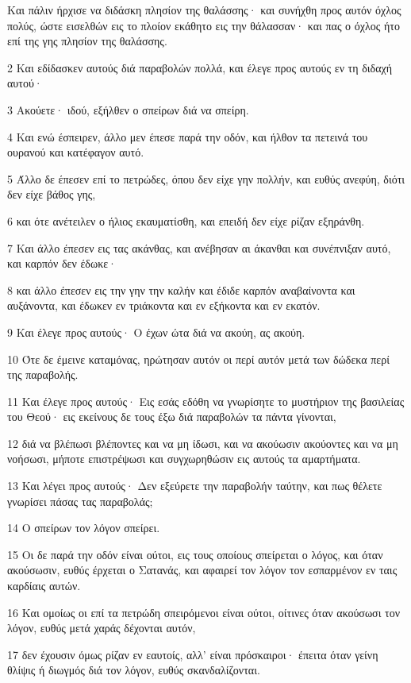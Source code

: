 \par Και πάλιν ήρχισε να διδάσκη πλησίον της θαλάσσης· και συνήχθη προς αυτόν όχλος πολύς, ώστε εισελθών εις το πλοίον εκάθητο εις την θάλασσαν· και πας ο όχλος ήτο επί της γης πλησίον της θαλάσσης.
\par 2 Και εδίδασκεν αυτούς διά παραβολών πολλά, και έλεγε προς αυτούς εν τη διδαχή αυτού·
\par 3 Ακούετε· ιδού, εξήλθεν ο σπείρων διά να σπείρη.
\par 4 Και ενώ έσπειρεν, άλλο μεν έπεσε παρά την οδόν, και ήλθον τα πετεινά του ουρανού και κατέφαγον αυτό.
\par 5 Άλλο δε έπεσεν επί το πετρώδες, όπου δεν είχε γην πολλήν, και ευθύς ανεφύη, διότι δεν είχε βάθος γης,
\par 6 και ότε ανέτειλεν ο ήλιος εκαυματίσθη, και επειδή δεν είχε ρίζαν εξηράνθη.
\par 7 Και άλλο έπεσεν εις τας ακάνθας, και ανέβησαν αι άκανθαι και συνέπνιξαν αυτό, και καρπόν δεν έδωκε·
\par 8 και άλλο έπεσεν εις την γην την καλήν και έδιδε καρπόν αναβαίνοντα και αυξάνοντα, και έδωκεν εν τριάκοντα και εν εξήκοντα και εν εκατόν.
\par 9 Και έλεγε προς αυτούς· Ο έχων ώτα διά να ακούη, ας ακούη.
\par 10 Ότε δε έμεινε καταμόνας, ηρώτησαν αυτόν οι περί αυτόν μετά των δώδεκα περί της παραβολής.
\par 11 Και έλεγε προς αυτούς· Εις εσάς εδόθη να γνωρίσητε το μυστήριον της βασιλείας του Θεού· εις εκείνους δε τους έξω διά παραβολών τα πάντα γίνονται,
\par 12 διά να βλέπωσι βλέποντες και να μη ίδωσι, και να ακούωσιν ακούοντες και να μη νοήσωσι, μήποτε επιστρέψωσι και συγχωρηθώσιν εις αυτούς τα αμαρτήματα.
\par 13 Και λέγει προς αυτούς· Δεν εξεύρετε την παραβολήν ταύτην, και πως θέλετε γνωρίσει πάσας τας παραβολάς;
\par 14 Ο σπείρων τον λόγον σπείρει.
\par 15 Οι δε παρά την οδόν είναι ούτοι, εις τους οποίους σπείρεται ο λόγος, και όταν ακούσωσιν, ευθύς έρχεται ο Σατανάς, και αφαιρεί τον λόγον τον εσπαρμένον εν ταις καρδίαις αυτών.
\par 16 Και ομοίως οι επί τα πετρώδη σπειρόμενοι είναι ούτοι, οίτινες όταν ακούσωσι τον λόγον, ευθύς μετά χαράς δέχονται αυτόν,
\par 17 δεν έχουσιν όμως ρίζαν εν εαυτοίς, αλλ' είναι πρόσκαιροι· έπειτα όταν γείνη θλίψις ή διωγμός διά τον λόγον, ευθύς σκανδαλίζονται.
